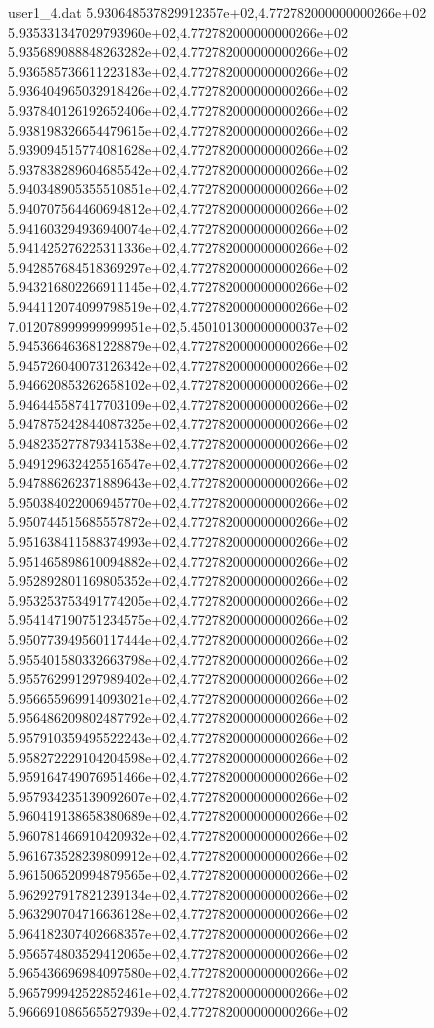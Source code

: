 \begin{filecontents}{user1_4.dat}
5.930648537829912357e+02,4.772782000000000266e+02
5.935331347029793960e+02,4.772782000000000266e+02
5.935689088848263282e+02,4.772782000000000266e+02
5.936585736611223183e+02,4.772782000000000266e+02
5.936404965032918426e+02,4.772782000000000266e+02
5.937840126192652406e+02,4.772782000000000266e+02
5.938198326654479615e+02,4.772782000000000266e+02
5.939094515774081628e+02,4.772782000000000266e+02
5.937838289604685542e+02,4.772782000000000266e+02
5.940348905355510851e+02,4.772782000000000266e+02
5.940707564460694812e+02,4.772782000000000266e+02
5.941603294936940074e+02,4.772782000000000266e+02
5.941425276225311336e+02,4.772782000000000266e+02
5.942857684518369297e+02,4.772782000000000266e+02
5.943216802266911145e+02,4.772782000000000266e+02
5.944112074099798519e+02,4.772782000000000266e+02
7.012078999999999951e+02,5.450101300000000037e+02
5.945366463681228879e+02,4.772782000000000266e+02
5.945726040073126342e+02,4.772782000000000266e+02
5.946620853262658102e+02,4.772782000000000266e+02
5.946445587417703109e+02,4.772782000000000266e+02
5.947875242844087325e+02,4.772782000000000266e+02
5.948235277879341538e+02,4.772782000000000266e+02
5.949129632425516547e+02,4.772782000000000266e+02
5.947886262371889643e+02,4.772782000000000266e+02
5.950384022006945770e+02,4.772782000000000266e+02
5.950744515685557872e+02,4.772782000000000266e+02
5.951638411588374993e+02,4.772782000000000266e+02
5.951465898610094882e+02,4.772782000000000266e+02
5.952892801169805352e+02,4.772782000000000266e+02
5.953253753491774205e+02,4.772782000000000266e+02
5.954147190751234575e+02,4.772782000000000266e+02
5.950773949560117444e+02,4.772782000000000266e+02
5.955401580332663798e+02,4.772782000000000266e+02
5.955762991297989402e+02,4.772782000000000266e+02
5.956655969914093021e+02,4.772782000000000266e+02
5.956486209802487792e+02,4.772782000000000266e+02
5.957910359495522243e+02,4.772782000000000266e+02
5.958272229104204598e+02,4.772782000000000266e+02
5.959164749076951466e+02,4.772782000000000266e+02
5.957934235139092607e+02,4.772782000000000266e+02
5.960419138658380689e+02,4.772782000000000266e+02
5.960781466910420932e+02,4.772782000000000266e+02
5.961673528239809912e+02,4.772782000000000266e+02
5.961506520994879565e+02,4.772782000000000266e+02
5.962927917821239134e+02,4.772782000000000266e+02
5.963290704716636128e+02,4.772782000000000266e+02
5.964182307402668357e+02,4.772782000000000266e+02
5.956574803529412065e+02,4.772782000000000266e+02
5.965436696984097580e+02,4.772782000000000266e+02
5.965799942522852461e+02,4.772782000000000266e+02
5.966691086565527939e+02,4.772782000000000266e+02

\end{filecontents}
